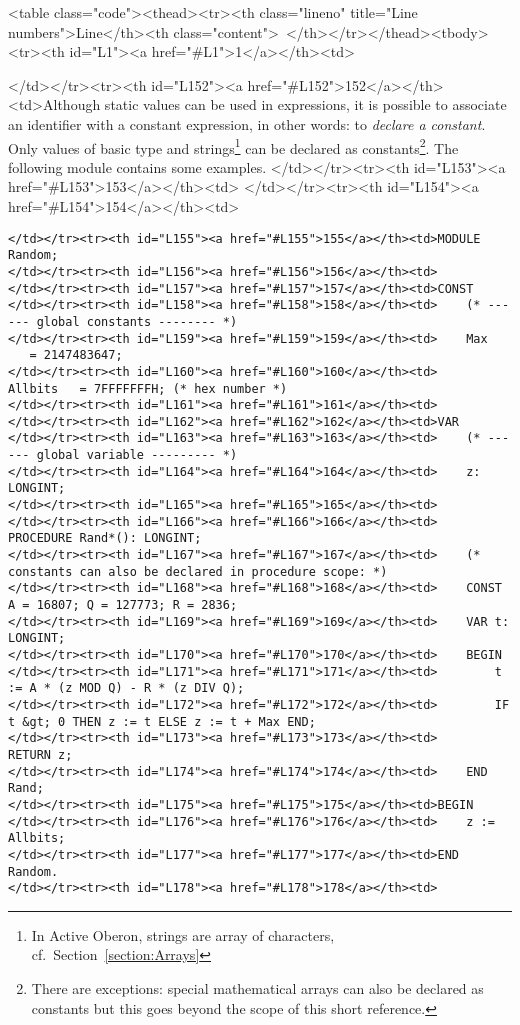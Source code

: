 <table class="code"><thead><tr><th class="lineno" title="Line numbers">Line</th><th class="content"> </th></tr></thead><tbody><tr><th id="L1"><a href="#L1">1</a></th><td>\documentclass[a4paper,11pt]{article}
\begin{document}
</td></tr><tr><th id="L152"><a href="#L152">152</a></th><td>Although static values can be used in expressions, it is possible to associate an identifier with a constant expression, in other words: to {\em declare a constant}. Only values of basic type and strings\footnote{In Active Oberon, strings are array of characters, cf.~Section~\ref{section:Arrays}} can be declared as constants\footnote{There are exceptions: special mathematical arrays can also be declared as constants but this goes beyond the scope of this short reference.}. The following module contains some examples.
</td></tr><tr><th id="L153"><a href="#L153">153</a></th><td>
</td></tr><tr><th id="L154"><a href="#L154">154</a></th><td>\begin{lstlisting}[language=Oberon,frame=none,caption={Declaration and Usage of Constants}]
</td></tr><tr><th id="L155"><a href="#L155">155</a></th><td>MODULE Random;
</td></tr><tr><th id="L156"><a href="#L156">156</a></th><td>
</td></tr><tr><th id="L157"><a href="#L157">157</a></th><td>CONST
</td></tr><tr><th id="L158"><a href="#L158">158</a></th><td>    (* ------ global constants -------- *)
</td></tr><tr><th id="L159"><a href="#L159">159</a></th><td>    Max       = 2147483647;
</td></tr><tr><th id="L160"><a href="#L160">160</a></th><td>    Allbits   = 7FFFFFFFH; (* hex number *)
</td></tr><tr><th id="L161"><a href="#L161">161</a></th><td>
</td></tr><tr><th id="L162"><a href="#L162">162</a></th><td>VAR
</td></tr><tr><th id="L163"><a href="#L163">163</a></th><td>    (* ------ global variable --------- *)
</td></tr><tr><th id="L164"><a href="#L164">164</a></th><td>    z: LONGINT;
</td></tr><tr><th id="L165"><a href="#L165">165</a></th><td>
</td></tr><tr><th id="L166"><a href="#L166">166</a></th><td>    PROCEDURE Rand*(): LONGINT;
</td></tr><tr><th id="L167"><a href="#L167">167</a></th><td>    (* constants can also be declared in procedure scope: *)
</td></tr><tr><th id="L168"><a href="#L168">168</a></th><td>    CONST A = 16807; Q = 127773; R = 2836;
</td></tr><tr><th id="L169"><a href="#L169">169</a></th><td>    VAR t: LONGINT;
</td></tr><tr><th id="L170"><a href="#L170">170</a></th><td>    BEGIN
</td></tr><tr><th id="L171"><a href="#L171">171</a></th><td>        t := A * (z MOD Q) - R * (z DIV Q);
</td></tr><tr><th id="L172"><a href="#L172">172</a></th><td>        IF t &gt; 0 THEN z := t ELSE z := t + Max END;
</td></tr><tr><th id="L173"><a href="#L173">173</a></th><td>        RETURN z;
</td></tr><tr><th id="L174"><a href="#L174">174</a></th><td>    END Rand;
</td></tr><tr><th id="L175"><a href="#L175">175</a></th><td>BEGIN
</td></tr><tr><th id="L176"><a href="#L176">176</a></th><td>    z := Allbits;
</td></tr><tr><th id="L177"><a href="#L177">177</a></th><td>END Random.
</td></tr><tr><th id="L178"><a href="#L178">178</a></th><td>\end{lstlisting}
\end{document}
